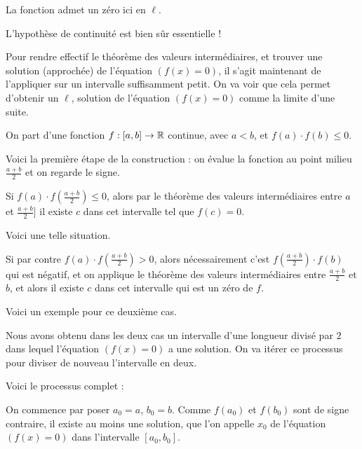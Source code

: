 La fonction admet un zéro ici en $\ell$.

L'hypothèse de continuité est bien sûr essentielle !


\diapo

Pour rendre effectif le théorème des valeurs intermédiaires, et trouver une solution (approchée) de l'équation $(f(x)=0)$, 
il s'agit maintenant de l'appliquer sur un intervalle suffisamment petit. 
On va voir que cela permet d'obtenir un $\ell$, solution de l'équation $(f(x)=0)$ comme la limite d'une suite.

On part d'une fonction $f : [a,b] \to \mathbb{R}$ continue, avec $a < b$, et $f(a)\cdot f(b)\le0$. 

\change

Voici la première étape de la construction : on évalue la fonction au point milieu $\frac{a+b}{2}$ 
et on regarde le signe.

\change

Si $f(a)\cdot f(\frac{a+b}{2})\le0$, alors par le théorème des valeurs intermédiaires
entre $a$ et $\frac{a+b}{2}]$ il existe 
  $c$ dans cet intervalle tel que $f(c)=0$.
  
\change

Voici une telle situation.

\change

Si par contre $f(a)\cdot f(\frac{a+b}{2})>0$, alors nécessairement c'est 
  $f(\frac{a+b}{2})\cdot f(b)$ qui est négatif, et on applique le théorème des valeurs intermédiaires
  entre $\frac{a+b}{2}$ et $b$, et alors il existe $c$ dans cet intervalle qui est un zéro de $f$.
  
\change 

Voici un exemple pour ce deuxième cas.

\change


Nous avons obtenu dans les deux cas un intervalle d'une longueur divisé par $2$ dans 
lequel l'équation $(f(x)=0)$ a une solution. On va itérer ce processus
pour diviser de nouveau l'intervalle en deux.



\diapo

Voici le processus complet :


On commence par poser $a_0=a$, $b_0=b$. Comme $f(a_0)$ et $f(b_0)$ sont de signe contraire,
il existe au moins une solution, que l'on appelle $x_0$ de l'équation $(f(x)=0)$ dans l'intervalle $[a_0,b_0]$.

